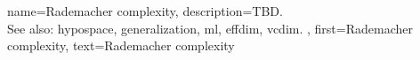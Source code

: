 {name={Rademacher complexity},
	description={TBD. 
		\\
		See also: \gls{hypospace}, \gls{generalization}, \gls{ml}, \gls{effdim}, \gls{vcdim}. },
	first={Rademacher complexity},
	text={Rademacher complexity}  
}


